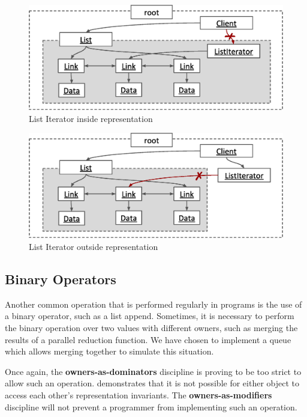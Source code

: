 \documentclass{acm_proc_article-sp}
\begin{document}
\begin{figure}[t]
	\centering
	\includegraphics{iterator-fail-inside.eps}
	\caption{List Iterator inside representation}
	\label{fig:iterator-inside}
\end{figure}

\begin{figure}[t]
	\centering
	\includegraphics{iterator-fail-outside.eps}
	\caption{List Iterator outside representation}
	\label{fig:iterator-outside}
\end{figure}

\subsection{Binary Operators}
\label{subsec:binary_ops}

Another common operation that is performed regularly in programs is the use of
a binary operator, such as a list append. Sometimes, it is necessary to perform
the binary operation over two values with different owners, such as merging the
results of a parallel reduction function. We have chosen to implement a queue
which allows merging together to simulate this situation.

Once again, the \textbf{owners-as-dominators} discipline is proving to be too
strict to allow such an operation.  demonstrates
that it is not possible for either object to access each other's representation 
invariants. The \textbf{owners-as-modifiers} discipline will not prevent a
programmer from implementing such an operation.
\end{document}
